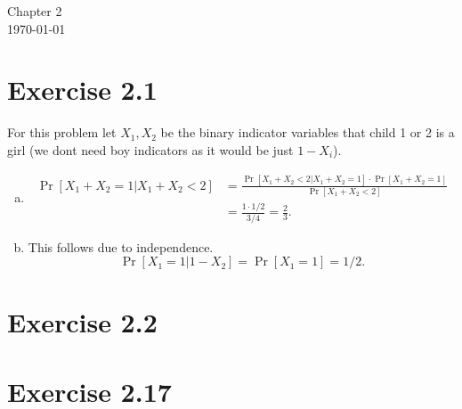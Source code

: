 \documentclass[12pt]{article}
\newcommand{\bayes}[2]{\frac{\Pr[#1|#2] \cdot \Pr[#2]}{\Pr[#1]}}
\begin{document}
\begin{center}
{\Large Chapter 2}\\
\today
\end{center}
\section*{Exercise 2.1}
For this problem let $X_1, X_2$ be the binary indicator variables that child 1 or 2
is a girl (we dont need boy indicators as it would be just $1 - X_i$).
\begin{enumerate}[a)]
    \item
        \begin{align*}
            \Pr[X_1 + X_2 = 1| X_1 + X_2 < 2] &= \bayes{X_1 + X_2 < 2}{X_1 + X_2 = 1}\\
            &= \frac{1 \cdot 1/2}{3/4} = \frac{2}{3}.
        \end{align*}
    \item
        This follows due to independence.
        \[\Pr[X_1 = 1|1 - X_2] = \Pr[X_1 = 1] = 1/2.\]
\end{enumerate}
\section*{Exercise 2.2}
\section*{Exercise 2.17}
\end{document}

